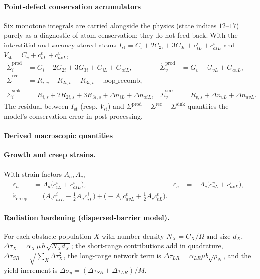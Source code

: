 \documentclass{article}
\begin{document}
\paragraph{Point-defect conservation accumulators}
Six monotone integrals are carried alongside the physics (state indices
$12\text{--}17$) purely as a diagnostic of atom conservation; they do not feed
back. With the interstitial and vacancy stored atoms
$I_{\mathrm{st}}=C_i+2C_{2i}+3C_{3i}+c_{iL}^{i}+c_{aiL}^{i}$ and
$V_{\mathrm{st}}=C_v+c_{vL}^{v}+c_{avL}^{v}$,
\begin{align}
\dot{\Sigma}^{\mathrm{prod}}_i &= G_i+2G_{2i}+3G_{3i}+G_{iL}+G_{aiL}, &
\dot{\Sigma}^{\mathrm{prod}}_v &= G_v+G_{vL}+G_{avL},\\
\dot{\Sigma}^{\mathrm{rec}} &= R_{i,v}+R_{2i,v}+R_{3i,v}+\text{loop\_recomb}, & & \\
\dot{\Sigma}^{\mathrm{sink}}_i &= R_{i,s}+2R_{2i,s}+3R_{3i,s}+\Delta n_{iL}+\Delta n_{aiL}, &
\dot{\Sigma}^{\mathrm{sink}}_v &= R_{v,s}+\Delta n_{vL}+\Delta n_{avL}.
\end{align}
The residual between $I_{\mathrm{st}}$ (resp. $V_{\mathrm{st}}$) and
$\Sigma^{\mathrm{prod}}-\Sigma^{\mathrm{rec}}-\Sigma^{\mathrm{sink}}$ quantifies
the model's conservation error in post-processing.

\paragraph{Derived macroscopic quantities}
\paragraph{Growth and creep strains.} With strain factors $A_a,A_c$,
\begin{align}
\varepsilon_a &= A_a\bigl(c_{iL}^{i}+c_{aiL}^{i}\bigr), &
\varepsilon_c &= -A_c\bigl(c_{vL}^{v}+c_{avL}^{v}\bigr),\\
\dot\varepsilon_{\mathrm{creep}} &= \bigl(A_a c_{aiL}^{i}-\tfrac12 A_a c_{iL}^{i}\bigr)
   +\bigl(-A_c c_{avL}^{v}+\tfrac12 A_c c_{vL}^{v}\bigr). & &
\end{align}
\paragraph{Radiation hardening (dispersed-barrier model).} For each obstacle
population $X$ with number density $N_X=C_X/\Omega$ and size $d_X$,
$\Delta\tau_X=\alpha_X\,\mu\,b\,\sqrt{N_X d_X}$; the short-range contributions
add in quadrature, $\Delta\tau_{SR}=\sqrt{\sum_X\Delta\tau_X^2}$, the long-range
network term is $\Delta\tau_{LR}=\alpha_{LR}\mu b\sqrt{\rho_N}$, and the yield
increment is $\Delta\sigma_y=(\Delta\tau_{SR}+\Delta\tau_{LR})/M$.
\end{document}
